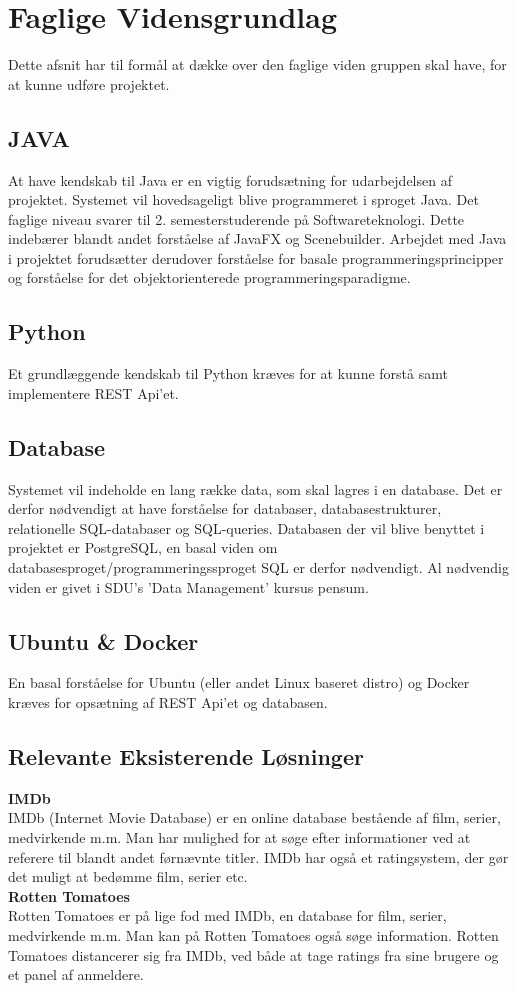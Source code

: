 \section{Faglige Vidensgrundlag}
Dette afsnit har til formål at dække over den faglige viden gruppen skal have, for at kunne udføre projektet.

\subsection{JAVA}
At have kendskab til Java er en vigtig forudsætning for udarbejdelsen af projektet. Systemet vil hovedsageligt blive programmeret i sproget Java. Det faglige niveau svarer til 2. semesterstuderende på Softwareteknologi. Dette indebærer blandt andet forståelse af JavaFX og Scenebuilder.
Arbejdet med Java i projektet forudsætter derudover forståelse for basale programmeringsprincipper og forståelse for det objektorienterede programmeringsparadigme. 

\subsection{Python}
Et grundlæggende kendskab til Python kræves for at kunne forstå samt implementere REST Api'et.

\subsection{Database}
Systemet vil indeholde en lang række data, som skal lagres i en database. Det er derfor nødvendigt at have forståelse for databaser, databasestrukturer, relationelle SQL-databaser og SQL-queries. Databasen der vil blive benyttet i projektet er PostgreSQL, en basal viden om databasesproget/programmeringssproget SQL er derfor nødvendigt. 
Al nødvendig viden er givet i SDU's 'Data Management' kursus pensum.

\subsection{Ubuntu \& Docker}
En basal forståelse for Ubuntu (eller andet Linux baseret distro) og Docker kræves for opsætning af REST Api'et og databasen.

\subsection{Relevante Eksisterende Løsninger}
\textbf{IMDb} \\
IMDb (Internet Movie Database) er en online database bestående af film, serier, medvirkende m.m. Man har mulighed for at søge efter informationer ved at referere til blandt andet førnævnte titler. IMDb har også et ratingsystem, der gør det muligt at bedømme film, serier etc.\\
\textbf{Rotten Tomatoes} \\
Rotten Tomatoes er på lige fod med IMDb, en database for film, serier, medvirkende m.m. Man kan på Rotten Tomatoes også søge information. Rotten Tomatoes distancerer sig fra IMDb, ved både at tage ratings fra sine brugere og et panel af anmeldere. 